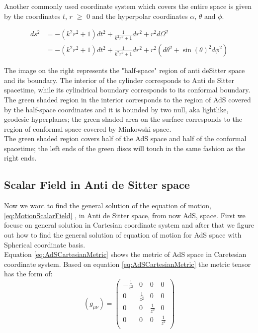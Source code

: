 Another commonly used coordinate system which covers the entire space is given by the coordinates $t$, $r$ $\geqslant$ $0$ and the hyperpolar coordinates $\alpha$, $\theta$ and $\phi$.

\begin{align} \label{eq:AdSSphericalMetric}
    ds^2 &= - \left( k^2r^2 + 1\right)dt^2 + \frac{1}{k^2r^2+1}dr^2 + r^2 d\Omega^2 \\
         &= - \left( k^2r^2 + 1\right)dt^2 + \frac{1}{k^2r^2+1}dr^2 + r^2 \left( d\theta^2 + \sin{(\theta)}^2 d\phi^2 \right) \nonumber
\end{align}

The image on the right represents the "half-space" region of anti deSitter space and its boundary. The interior of the cylinder corresponds to Anti de Sitter spacetime, while its cylindrical boundary corresponds to its conformal boundary. The green shaded region in the interior corresponds to the region of AdS covered by the half-space coordinates and it is bounded by two null, aka lightlike, geodesic hyperplanes; the green shaded area on the surface corresponds to the region of conformal space covered by Minkowski space.\\

The green shaded region covers half of the AdS space and half of the conformal spacetime; the left ends of the green discs will touch in the same fashion as the right ends.\\

\subsection{Scalar Field in Anti de Sitter space}

Now we want to find the general solution of the equation of motion, \ref{eq:MotionScalarField} , in Anti de Sitter space, from now AdS, space. First we focuse on general solution in Cartesian coordinate system and after that we figure out how to find the general solution of equation of motion for AdS space with Spherical coordinate basis.\\

Equation \ref{eq:AdSCartesianMetric} shows the metric of AdS space in Caretesian coordinate system. Based on equation \ref{eq:AdSCartesianMetric} the metric tensor has the form of:\\

\begin{equation} \label{eq:AdSCartesianMetricTensor}
    (g_{\mu\nu}) = 
    \begin{pmatrix}
        -\frac{1}{z^2} & 0 & 0 & 0 \\
        0 & \frac{1}{z^2} & 0 & 0 \\
        0 & 0 & \frac{1}{z^2} & 0 \\
        0 & 0 & 0 & \frac{1}{z^2} \\
    \end{pmatrix}
\end{equation}

